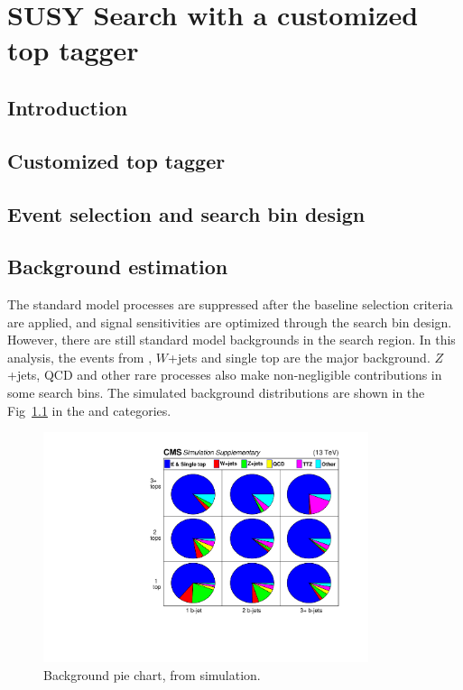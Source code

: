 \chapter{SUSY Search with a customized top tagger}

\section{Introduction}
\label{sec:c4intro}


\section{Customized top tagger}
\label{sec:c4tt}


\section{Event selection and search bin design}
\label{sec:c4evssbd}


\section{Background estimation}

The standard model processes are suppressed after the baseline selection criteria are applied, and signal sensitivities are optimized through the search bin design. However, there are still standard model backgrounds in the search region. In this analysis, the events from \ttbar, $W$+jets and single top are the major background. $Z$+jets, QCD and other rare processes also make non-negligible contributions in some search bins. The simulated background distributions are shown in the Fig~\ref{fig:c4bgmcpie} in the \ntops and \nbjets categories.

\begin{figure}[htbp]
 \begin{center}
  \includegraphics[width=0.85\textwidth]{figures/c4/c4_bg_mcpie.pdf}
 \end{center}
 \caption{Background pie chart, from simulation.}
 \label{fig:c4bgmcpie}
\end{figure}

